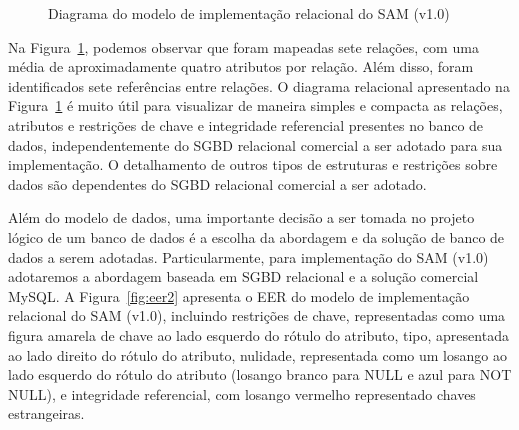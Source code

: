 \documentclass{article}
\begin{document}
\begin{center}
\begin{figure}[!htb]
{
}
\caption{Diagrama do modelo de implementa\c{c}\~ao relacional do SAM (v1.0)}
\label{fig:eer}
\end{figure}
\end{center}

Na Figura~\ref{fig:eer}, podemos observar que foram mapeadas sete rela\c{c}\~oes, com uma m\'edia de aproximadamente quatro atributos por rela\c{c}\~ao. Al\'em disso, foram identificados sete refer\^encias entre rela\c{c}\~oes.
O diagrama relacional apresentado na Figura~\ref{fig:eer} \'e muito \'util para visualizar de maneira simples e compacta as rela\c{c}\~oes, atributos e restri\c{c}\~oes de chave e integridade referencial presentes no banco de dados, independentemente do SGBD relacional comercial a ser adotado para sua implementa\c{c}\~ao.
O detalhamento de outros tipos de estruturas e restri\c{c}\~oes sobre dados s\~ao dependentes do SGBD relacional comercial a ser adotado.

Al\'em do modelo de dados, uma importante decis\~ao a ser tomada no projeto l\'ogico de um banco de dados \'e a escolha da abordagem e da solu\c{c}\~ao de banco de dados a serem adotadas.
Particularmente, para implementa\c{c}\~ao do SAM (v1.0) adotaremos a abordagem baseada em SGBD relacional e a solu\c{c}\~ao comercial MySQL. A Figura~\ref{fig:eer2} apresenta o EER do modelo de implementa\c{c}\~ao relacional do SAM (v1.0), incluindo restri\c{c}\~oes de chave, representadas como uma figura amarela de chave ao lado esquerdo do r\'otulo do atributo, tipo, apresentada ao lado direito do r\'otulo do atributo, nulidade, representada como um losango ao lado esquerdo do r\'otulo do atributo (losango branco para NULL e azul para NOT NULL), e integridade referencial, com losango vermelho representado chaves estrangeiras.
\end{document}
